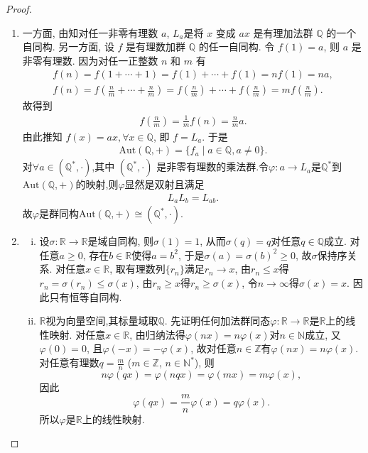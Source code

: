 \documentclass[../../main.tex]{subfiles}%
\begin{document}
\begin{proof}
\begin{enumerate}[(1)]
\item 一方面, 由知对任一非零有理数 $a$, $L_a$是将 $x$ 变成 $ax$ 是有理加法群 $\mathbb{Q}$ 的一个自同构. 另一方面, 设 $f$ 是有理数加群 $\mathbb{Q}$ 的任一自同构. 令 $f(1)=a$, 则 $a$ 是非零有理数. 因为对任一正整数 $n$ 和 $m$ 有
\begin{gather*}
f(n) = f(1+\cdots+1) = f(1)+\cdots+f(1) = nf(1) = na, \\
f(n) = f\left(\frac{n}{m}+\cdots+\frac{n}{m}\right) = f\left(\frac{n}{m}\right)+\cdots+f\left(\frac{n}{m}\right) = mf\left(\frac{n}{m}\right).
\end{gather*}
故得到
\begin{align*}
f\left(\frac{n}{m}\right) = \frac{1}{m}f(n) = \frac{n}{m}a.
\end{align*}
由此推知 $f(x)=ax, \forall x \in \mathbb{Q}$, 即 $f = L_a$. 于是
\begin{align*}
\mathrm{Aut}(\mathbb{Q},+) = \{f_a \mid a \in \mathbb{Q}, a \neq 0\}.
\end{align*}
对$\forall a\in (\mathbb{Q}^*,\cdot)$,其中 $(\mathbb{Q}^*,\cdot)$ 是非零有理数的乘法群.令$\varphi:a\to L_a$是$\mathbb{Q}^*$到$\text{Aut}(\mathbb{Q},+)$的映射,则$\varphi$显然是双射且满足
\begin{align*}
L_a L_b = L_{ab}.
\end{align*}
故$\varphi$是群同构$\mathrm{Aut}(\mathbb{Q},+) \cong (\mathbb{Q}^*,\cdot)$.

\item \begin{enumerate}[(i)]
\item 设$\sigma:\mathbb{R}\to\mathbb{R}$是域自同构, 则$\sigma(1)=1$, 从而$\sigma(q)=q$对任意$q\in\mathbb{Q}$成立. 对任意$a\geqslant 0$, 存在$b\in\mathbb{R}$使得$a=b^{2}$, 于是$\sigma(a)=\sigma(b)^{2}\geqslant 0$, 故$\sigma$保持序关系. 对任意$x\in\mathbb{R}$, 取有理数列$\{r_{n}\}$满足$r_{n}\to x$, 由$r_{n}\leqslant x$得$r_{n}=\sigma(r_{n})\leqslant\sigma(x)$, 由$r_{n}\geqslant x$得$r_{n}\geqslant\sigma(x)$, 令$n\to\infty$得$\sigma(x)=x$. 因此只有恒等自同构.

\item $\mathbb{R}$视为向量空间,其标量域取$\mathbb{Q}$. 先证明任何加法群同态$\varphi:\mathbb{R}\to\mathbb{R}$是$\mathbb{R}$上的线性映射. 对任意$x\in\mathbb{R}$, 由归纳法得$\varphi(nx)=n\varphi(x)$对$n\in\mathbb{N}$成立, 又$\varphi(0)=0$, 且$\varphi(-x)=-\varphi(x)$, 故对任意$n\in\mathbb{Z}$有$\varphi(nx)=n\varphi(x)$. 对任意有理数$q=\frac{m}{n}$ ($m\in\mathbb{Z}$, $n\in\mathbb{N}^*$), 则
$$
n\varphi(qx)=\varphi(nqx)=\varphi(mx)=m\varphi(x),
$$ 
因此
$$
\varphi(qx)=\frac{m}{n}\varphi(x)=q\varphi(x).
$$
所以$\varphi$是$\mathbb{R}$上的线性映射.


\end{enumerate}
\end{enumerate}
\end{proof}
\end{document}
